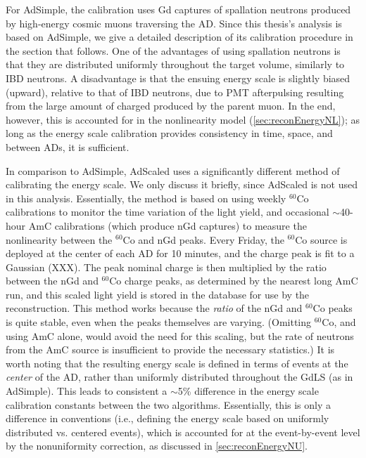 \documentclass[../thesis.tex]{subfiles}
\begin{document}
For AdSimple, the calibration uses Gd captures of spallation neutrons produced by high-energy cosmic muons traversing the AD. Since this thesis's analysis is based on AdSimple, we give a detailed description of its calibration procedure in the section that follows. One of the advantages of using spallation neutrons is that they are distributed uniformly throughout the target volume, similarly to IBD neutrons. A disadvantage is that the ensuing energy scale is slightly biased (upward), relative to that of IBD neutrons, due to PMT afterpulsing resulting from the large amount of charged produced by the parent muon. In the end, however, this is accounted for in the nonlinearity model (\autoref{sec:reconEnergyNL}); as long as the energy scale calibration provides consistency in time, space, and between ADs, it is sufficient.

In comparison to AdSimple, AdScaled uses a significantly different method of calibrating the energy scale. We only discuss it briefly, since AdScaled is not used in this analysis. Essentially, the method is based on using weekly $^{60}$Co calibrations to monitor the time variation of the light yield, and occasional $\sim$40-hour AmC calibrations (which produce nGd captures) to measure the nonlinearity between the $^{60}$Co and nGd peaks. Every Friday, the $^{60}$Co source is deployed at the center of each AD for 10 minutes, and the charge peak is fit to a Gaussian (XXX). The peak nominal charge is then multiplied by the ratio between the nGd and $^{60}$Co charge peaks, as determined by the nearest long AmC run, and this scaled light yield is stored in the database for use by the reconstruction. This method works because the \emph{ratio} of the nGd and $^{60}$Co peaks is quite stable, even when the peaks themselves are varying. (Omitting $^{60}$Co, and using AmC alone, would avoid the need for this scaling, but the rate of neutrons from the AmC source is insufficient to provide the necessary statistics.) It is worth noting that the resulting energy scale is defined in terms of events at the \emph{center} of the AD, rather than uniformly distributed throughout the GdLS (as in AdSimple). This leads to consistent a $\sim$5\% difference in the energy scale calibration constants between the two algorithms. Essentially, this is only a difference in conventions (i.e., defining the energy scale based on uniformly distributed vs. centered events), which is accounted for at the event-by-event level by the nonuniformity correction, as discussed in \autoref{sec:reconEnergyNU}.
\end{document}
